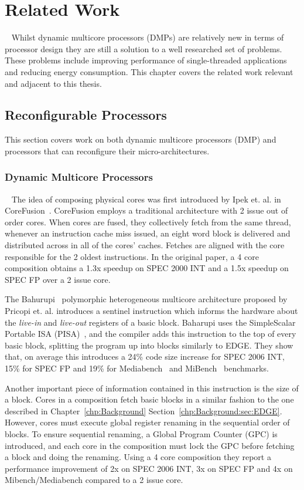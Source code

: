 \chapter{Related Work}~\label{chp:rw}
Whilst dynamic multicore processors (DMPs) are relatively new in terms of processor design they are still a solution to a well researched set of problems.
These problems include improving performance of single-threaded applications and reducing energy consumption.
This chapter covers the related work relevant and adjacent to this thesis.
\vspace{-3em}
\section{Reconfigurable Processors}

This section covers work on both dynamic multicore processors (DMP) and processors that can reconfigure their micro-architectures.
\vspace{-1em}
\subsection{Dynamic Multicore Processors}~\label{chp:rw:sec:dmp}
The idea of composing physical cores was first introduced by Ipek et. al. in CoreFusion~\cite{ipek2007CoreFusion}.
CoreFusion employs a traditional architecture with 2 issue out of order cores.
When cores are fused, they collectively fetch from the same thread, whenever an instruction cache miss issued, an eight word block is delivered and distributed across in all of the cores' caches.
Fetches are aligned with the core responsible for the 2 oldest instructions.
In the original paper, a 4 core composition obtains a 1.3x speedup on SPEC 2000 INT and a 1.5x speedup on SPEC FP over a 2 issue core.
 
The Bahurupi~\cite{pricopi2012bahurupi} polymorphic heterogeneous multicore architecture proposed by Pricopi et. al. introduces a sentinel instruction which informs the hardware about the \textit{live-in} and \textit{live-out} registers of a basic block.
Baharupi uses the SimpleScalar Portable ISA (PISA)~\cite{burger1997simplescalar}, and the compiler adds this instruction to the top of every basic block, splitting the program up into blocks similarly to EDGE.
They show that, on average this introduces a 24\% code size increase for SPEC 2006 INT, 15\% for SPEC FP and 19\% for Mediabench~\cite{mediabench} and MiBench~\cite{mibench} benchmarks.

Another important piece of information contained in this instruction is the size of a block.
Cores in a composition fetch basic blocks in a similar fashion to the one described in Chapter~\ref{chp:Background} Section~\ref{chp:Background:sec:EDGE}.
However, cores must execute global register renaming in the sequential order of blocks.
To ensure sequential renaming, a Global Program Counter (GPC) is introduced, and each core in the composition must lock the GPC before fetching a block and doing the renaming.
Using a 4 core composition they report a performance improvement of 2x on SPEC 2006 INT, 3x on SPEC FP and 4x on Mibench/Mediabench compared to a 2 issue core. 

